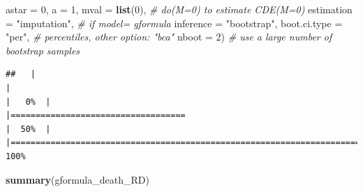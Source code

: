 \documentclass[
]{book}
\newenvironment{Shaded}{\begin{snugshade}}{\end{snugshade}}
\newcommand{\AttributeTok}[1]{\textcolor[rgb]{0.13,0.29,0.53}{#1}}
\newcommand{\CommentTok}[1]{\textcolor[rgb]{0.56,0.35,0.01}{\textit{#1}}}
\newcommand{\DecValTok}[1]{\textcolor[rgb]{0.00,0.00,0.81}{#1}}
\newcommand{\FunctionTok}[1]{\textcolor[rgb]{0.13,0.29,0.53}{\textbf{#1}}}
\newcommand{\NormalTok}[1]{#1}
\newcommand{\StringTok}[1]{\textcolor[rgb]{0.31,0.60,0.02}{#1}}
\begin{document}
\begin{Shaded}
\begin{Highlighting}[]
                           \AttributeTok{astar =} \DecValTok{0}\NormalTok{,}
                           \AttributeTok{a =} \DecValTok{1}\NormalTok{,}
                           \AttributeTok{mval =} \FunctionTok{list}\NormalTok{(}\DecValTok{0}\NormalTok{), }\CommentTok{\# do(M=0) to estimate CDE(M=0)}
                           \AttributeTok{estimation =} \StringTok{"imputation"}\NormalTok{, }\CommentTok{\# if model= gformula}
                           \AttributeTok{inference =} \StringTok{"bootstrap"}\NormalTok{,}
                           \AttributeTok{boot.ci.type =} \StringTok{"per"}\NormalTok{, }\CommentTok{\# percentiles, other option: "bca"}
                           \AttributeTok{nboot =} \DecValTok{2}\NormalTok{) }\CommentTok{\# use a large number of bootstrap samples}
\end{Highlighting}
\end{Shaded}

\begin{verbatim}
##   |                                                                              |                                                                      |   0%  |                                                                              |===================================                                   |  50%  |                                                                              |======================================================================| 100%
\end{verbatim}

\begin{Shaded}
\begin{Highlighting}[]
\FunctionTok{summary}\NormalTok{(gformula\_death\_RD)}
\end{Highlighting}
\end{Shaded}
\end{document}
